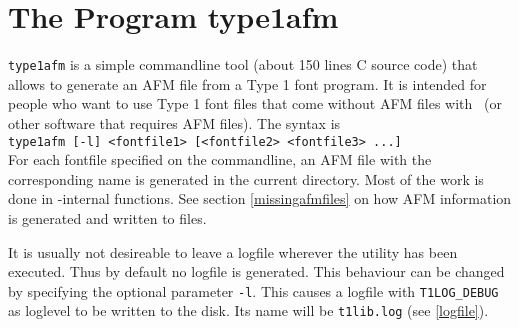 
\newpage
\section{The Program {\ttfamily type1afm}}
\label{type1afm}%
\verb+type1afm+ is a simple commandline tool (about 150 lines C source
code) that allows to generate an AFM file from a Type 1 font
program. It is intended for people who want to use Type 1 font files
that come without AFM files with \tonelib\ (or other software that
requires AFM files). The syntax is \\[0.5cm]
\verb+type1afm [-l] <fontfile1> [<fontfile2> <fontfile3> ...] +\\[0.5cm]
For each fontfile specified on the commandline, an AFM file with the
corresponding name is generated in the current directory.
Most of the work is done in \tonelib-internal functions. See section
\ref{missingafmfiles} on how AFM information is generated and written
to files.

It is usually not desireable to leave a logfile wherever the utility
has been executed. Thus by default no logfile is generated. This
behaviour can be changed by specifying the optional parameter
\verb+-l+. This causes a logfile with \verb+T1LOG_DEBUG+ as loglevel
to be written to the disk. Its name will be \verb+t1lib.log+ (see
\ref{logfile}). 

